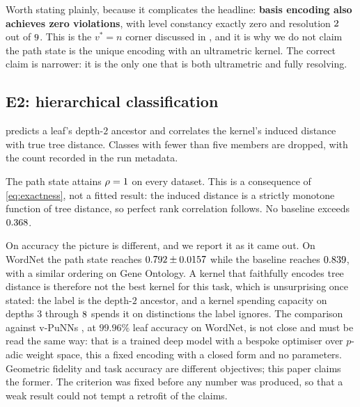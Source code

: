 Worth stating plainly, because it complicates the headline: \textbf{basis encoding also
achieves zero violations}, with level constancy exactly zero and resolution
$2$ out of $9$. This is the $v^{*} = n$ corner discussed in
, and it is why we do not claim the path state is the unique
encoding with an ultrametric kernel. The correct claim is narrower: it is the only one
that is both ultrametric and fully resolving.

\subsection{E2: hierarchical classification}
\label{subsec:e2}

\begin{table}
  \centering
  \caption{E2. Five-fold cross-validated accuracy with a precomputed-kernel SVM at
    $C = 1$; no hyperparameter was tuned. A dash marks an undefined rank correlation: a
    delta kernel gives every distinct pair the same distance.}
  \label{tab:e2}
  \footnotesize
  
\end{table}

 predicts a leaf's depth-$2$ ancestor and correlates the kernel's induced
distance with true tree distance. Classes with fewer than five members are dropped, with
the count recorded in the run metadata.

The path state attains $\rho = 1$ on every dataset. This is a consequence of
\cref{eq:exactness}, not a fitted result: the induced distance is a strictly monotone
function of tree distance, so perfect rank correlation follows. No baseline exceeds
$0.368$.

On accuracy the picture is different, and we report it as it came out. On WordNet the
path state reaches $0.792 \pm 0.0157$ while the
\ETwoBestBaseline{} baseline reaches $0.839$, with a similar
ordering on Gene Ontology. A kernel that faithfully encodes tree distance is therefore
not the best kernel for this task, which is unsurprising once stated: the label is the
depth-$2$ ancestor, and a kernel spending capacity on depths $3$ through $8$
spends it on distinctions the label ignores. The comparison against v-PuNNs
\citep{Nguessan2025VPuNNs}, at $99.96\%$ leaf accuracy on WordNet, is not close and must
be read the same way: that is a trained deep model with a bespoke optimiser over
$p$-adic weight space, this a fixed encoding with a closed form and no parameters.
Geometric fidelity and task accuracy are different objectives; this paper claims the
former. The criterion was fixed before any number was produced, so that a weak result
could not tempt a retrofit of the claims.

